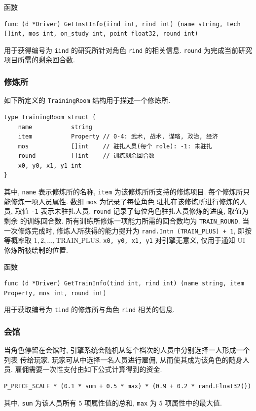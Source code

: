 \documentclass[UTF8, zihao=-4]{ctexart} %
\newcommand{\lcode}{\lstinline} % 段内插入代码
\begin{document}
函数
\begin{lstlisting}
func (d *Driver) GetInstInfo(iind int, rind int) (name string, tech []int, mos int, on_study int, point float32, round int)
\end{lstlisting}
用于获得编号为 \lcode{iind} 的研究所针对角色 \lcode{rind} 的相关信息.
\lcode{round} 为完成当前研究项目所需的剩余回合数.

\subsubsection{修炼所}
如下所定义的 \lcode{TrainingRoom} 结构用于描述一个修炼所.
\begin{lstlisting}
type TrainingRoom struct {
	name           string
	item           Property // 0-4: 武术, 战术, 谋略, 政治, 经济
	mos            []int    // 驻扎人员(每个 role): -1: 未驻扎
	round          []int    // 训练剩余回合数
	x0, y0, x1, y1 int
}
\end{lstlisting}
其中,  \lcode{name} 表示修炼所的名称, \lcode{item} 为该修炼所所支持的修炼项目.
每个修炼所只能修炼一项人员属性. 数组 \lcode{mos} 为记录了每位角色
驻扎在该修炼所进行修炼的人员, 取值 \lcode{-1} 表示未驻扎人员.
\lcode{round} 记录了每位角色驻扎人员修炼的进度, 取值为剩余
的训练回合数. 所有训练所修炼一项能力所需的回合数均为 \lcode{TRAIN_ROUND}.
当一次修炼完成时, 修炼人所获得的能力提升为 \lcode{rand.Intn (TRAIN_PLUS) + 1},
即按等概率取 $1, 2, \ldots, \text{TRAIN\_PLUS}$.
\lcode{x0, y0, x1, y1} 对引擎无意义, 仅用于通知 UI 修炼所被绘制的位置.

函数
\begin{lstlisting}
func (d *Driver) GetTrainInfo(tind int, rind int) (name string, item Property, mos int, round int)
\end{lstlisting}
用于获取编号为 \lcode{tind} 的修炼所与角色 \lcode{rind} 相关的信息.

\subsubsection{会馆}
当角色停留在会馆时, 引擎系统会随机从每个档次的人员中分别选择一人形成一个列表
传给玩家. 玩家可从中选择一名人员进行雇佣, 从而使其成为该角色的随身人员.
雇佣需要一次性支付由如下公式计算得到的资金.
\begin{lstlisting}
P_PRICE_SCALE * (0.1 * sum + 0.5 * max) * (0.9 + 0.2 * rand.Float32())
\end{lstlisting}
其中, \lcode{sum} 为该人员所有 $5$ 项属性值的总和, \lcode{max} 为 $5$ 项属性中的最大值. 
\end{document}
